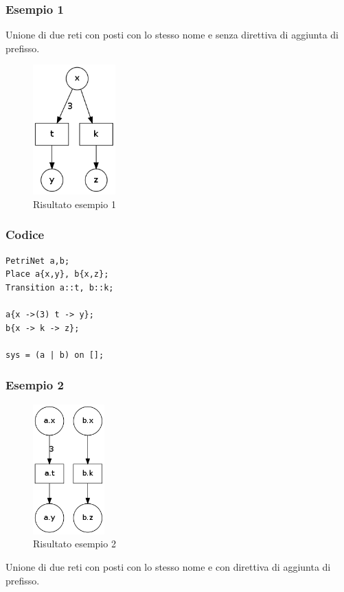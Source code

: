 \documentclass[italian,12pt]{book}
\begin{document}
\subsubsection{Esempio 1}
Unione di due reti con posti con lo stesso nome e senza direttiva di aggiunta
di prefisso.\\
\begin{figure}[htb]
\centerline{\includegraphics[height=5cm]{img/unione_001.png}}
\caption{Risultato esempio 1}\label{fig:unione_001.png}
\end{figure}

\subsubsection{Codice}
\begin{verbatim}
PetriNet a,b;
Place a{x,y}, b{x,z};
Transition a::t, b::k;

a{x ->(3) t -> y};
b{x -> k -> z};

sys = (a | b) on [];
\end{verbatim}


\subsubsection{Esempio 2}
\begin{figure}[htb]
\centerline{\includegraphics[height=5cm]{img/unione_002.png}}
\caption{Risultato esempio 2}\label{fig:unione_002.png}
\end{figure}
Unione di due reti con posti con lo stesso nome e con direttiva di aggiunta
di prefisso.\\
\end{document}
